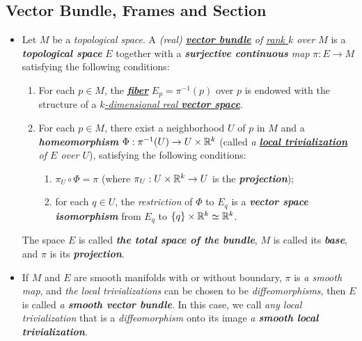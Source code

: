\documentclass[11pt]{article}
\begin{document}
\subsection{Vector Bundle, Frames and Section}
\begin{itemize}
\item \begin{definition}
Let $M$ be a \emph{topological space}. A \emph{(real) \underline{\textbf{vector bundle}} of \underline{rank $k$} over $M$} is a \emph{\textbf{topological space}} $E$ together with a \emph{\textbf{surjective continuous} map} $\pi: E \rightarrow M$ satisfying the following conditions:
\begin{enumerate}
\item For each $p \in M$, the \underline{\emph{\textbf{fiber}}} $E_{p} = \pi^{-1}(p)$ over $p$ is endowed with the structure of a \emph{\underline{$k$-dimensional real \textbf{vector space}}}.
\item For each $p \in M$, there exist a neighborhood $U$ of $p$ in $M$ and a \emph{\textbf{homeomorphism}} $\Phi: \pi^{-1}(U) \rightarrow U \times {\mathbb R}^k$ (called \emph{a \underline{\textbf{local trivialization}} of $E$ over $U$}), satisfying the following conditions:
\begin{enumerate}
\item $\pi_{U}\circ \Phi = \pi$ (where $\pi_U: U \times  {\mathbb R}^k \rightarrow U$ is the \emph{\textbf{projection}});
\item for each $q \in U$, the \emph{restriction} of $\Phi$ to $E_q$ is a \emph{\textbf{vector space}} \emph{\textbf{isomorphism}} from
$E_q$ to $\left\{q\right\} \times {\mathbb R}^k \simeq {\mathbb R}^k$.
\end{enumerate}
\end{enumerate}
The space $E$ is called \emph{\textbf{the total space of the bundle}}, $M$ is called its \emph{\textbf{base}}, and $\pi$ is its \emph{\textbf{projection}}. 
\end{definition}

\item \begin{definition}
If $M$ and $E$ are smooth manifolds with or without boundary, $\pi$ is \emph{a smooth map}, and \emph{the local trivializations} can be chosen to be \emph{diffeomorphisms}, then $E$ is called \emph{a \textbf{smooth vector bundle}}. In this case, we call \emph{any local trivialization} that is a \emph{diffeomorphism} onto its image \emph{a \textbf{smooth local trivialization}}.
\end{definition}


\end{itemize}
\end{document}
